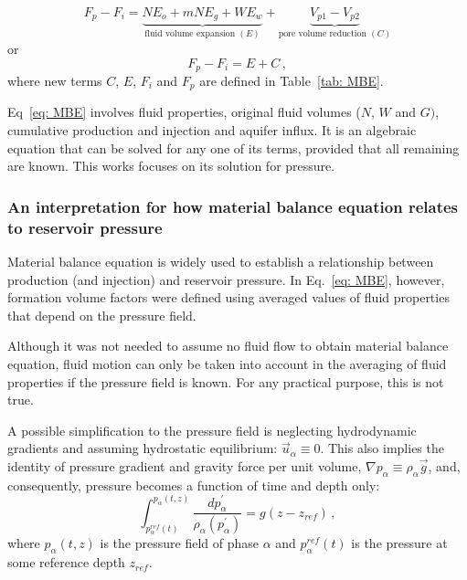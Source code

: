 \documentclass[final,authoryear,5p,times,twocolumn,10pt]{elsarticle}
\begin{document}
\begin{equation}\label{eq: MBE}
F_p - F_i= \underbrace{N E_o + mN E_g + W E_w}_{\text{fluid volume expansion } (E)} +\underbrace{V_{p1}-V_{p2}}_{\text{pore volume reduction } (C)}
\end{equation}
or
\begin{equation}\label{eq: MBE_short}
F_p - F_i= E + C \, ,
\end{equation}
where new terms $C$, $E$, $F_i$ and $F_p$ are defined in Table~\ref{tab: MBE}. 

Eq~\eqref{eq: MBE} involves fluid properties, original fluid volumes ($N$, $W$ and $G)$, cumulative production and injection and aquifer influx.
It is an algebraic equation that can be solved for any one of its terms, provided that all remaining are known. This works focuses on its solution for pressure.

\subsubsection{An interpretation for how material balance equation relates to reservoir pressure}


Material balance equation is widely used to establish a relationship between production (and injection) and reservoir pressure. In Eq.~\eqref{eq: MBE}, however, formation volume factors were defined using averaged values of fluid properties that depend on the pressure field.

Although it was not needed to assume no fluid flow to obtain material balance equation, fluid motion can only be taken into account in the averaging of fluid properties if the pressure field is known. For any practical purpose, this is not true.

A possible simplification to the pressure field is neglecting hydrodynamic gradients and assuming hydrostatic equilibrium: $\vec{u}_\alpha \equiv 0$. This also implies the identity of pressure gradient and gravity force per unit volume, $\nabla p_\alpha \equiv \rho_\alpha \vec{g}$, and, consequently, pressure becomes a function of time and depth only:
\begin{equation}\label{eq: p=rhogh}
\int_{p_\alpha^{ref} (t)}^{p_\alpha (t,z)} \frac{dp_\alpha^{'}}{\rho_\alpha \left(p_\alpha^{'}\right)} = g\left(z - z_{ref}\right) \, ,
\end{equation}
where $p_\alpha (t,z)$ is the pressure field of phase $\alpha$ and $p_\alpha^{ref} (t)$ is the pressure at some reference depth $z_{ref}$.
\end{document}
